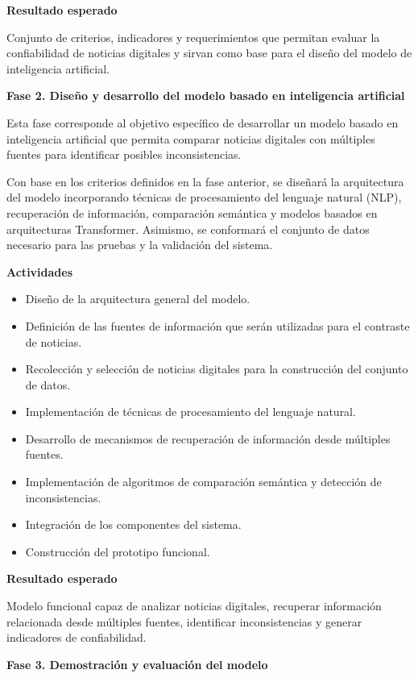 \documentclass[12pt]{article}
\begin{document}
\textbf{Resultado esperado}

Conjunto de criterios, indicadores y requerimientos que permitan evaluar la confiabilidad de noticias digitales y sirvan como base para el diseño del modelo de inteligencia artificial.

\textbf{Fase 2. Diseño y desarrollo del modelo basado en inteligencia artificial}

Esta fase corresponde al objetivo específico de desarrollar un modelo basado en inteligencia artificial que permita comparar noticias digitales con múltiples fuentes para identificar posibles inconsistencias.

Con base en los criterios definidos en la fase anterior, se diseñará la arquitectura del modelo incorporando técnicas de procesamiento del lenguaje natural (NLP), recuperación de información, comparación semántica y modelos basados en arquitecturas Transformer. Asimismo, se conformará el conjunto de datos necesario para las pruebas y la validación del sistema.

\textbf{Actividades}

\begin{itemize}
    \item Diseño de la arquitectura general del modelo.
    \item Definición de las fuentes de información que serán utilizadas para el contraste de noticias.
    \item Recolección y selección de noticias digitales para la construcción del conjunto de datos.
    \item Implementación de técnicas de procesamiento del lenguaje natural.
    \item Desarrollo de mecanismos de recuperación de información desde múltiples fuentes.
    \item Implementación de algoritmos de comparación semántica y detección de inconsistencias.
    \item Integración de los componentes del sistema.
    \item Construcción del prototipo funcional.
\end{itemize}

\textbf{Resultado esperado}

Modelo funcional capaz de analizar noticias digitales, recuperar información relacionada desde múltiples fuentes, identificar inconsistencias y generar indicadores de confiabilidad.

\textbf{Fase 3. Demostración y evaluación del modelo}
\end{document}

